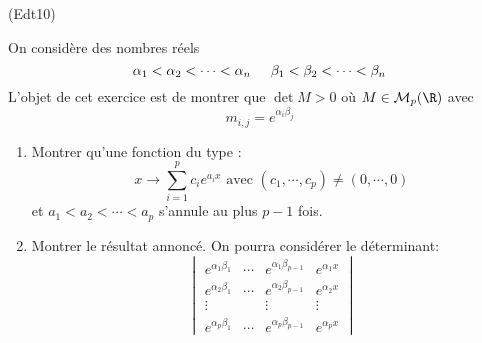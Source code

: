 \begin{tiny}(Edt10)\end{tiny}
On considère des nombres réels 
\begin{displaymath}
 \alpha_1 < \alpha_2 < \cdots <\alpha_n \hspace{0.5cm}
\beta_1 < \beta_2 < \cdots <\beta_n 
\end{displaymath}
L'objet de cet exercice est de montrer que $\det M >0$ où $M\in \mathcal{M}_p(\R)$ avec
\begin{displaymath}
 m_{i,j} = e^{\alpha_i \beta_j}
\end{displaymath}
\begin{enumerate}
 \item Montrer qu'une fonction du type :
\begin{displaymath}
 x \rightarrow \sum_{i=1}^{p}c_ie^{a_ix}
\text{ avec }
(c_1,\cdots,c_p) \neq (0,\cdots,0)
\end{displaymath}
et $a_1 < a_2 < \cdots < a_p$ s'annule au plus $p-1$ fois.
\item Montrer le résultat annoncé. On pourra considérer le déterminant:
\begin{displaymath}
 \begin{vmatrix}
  e^{\alpha_1\beta_1}& \cdots & e^{\alpha_1\beta_{p-1}} & e^{\alpha_1x} \\
  e^{\alpha_2\beta_1}& \cdots & e^{\alpha_2\beta_{p-1}} & e^{\alpha_2x} \\
  \vdots &  &\vdots  & \vdots \\
 e^{\alpha_p\beta_1}& \cdots & e^{\alpha_p\beta_{p-1}} & e^{\alpha_px} 
 \end{vmatrix}
\end{displaymath}

\end{enumerate}
